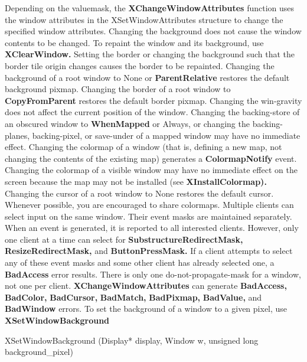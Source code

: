 \documentclass{report}
\begin{document}
\begin{itemize}
\begin{itemize}
            \end{itemize}
            Depending on the valuemask, the \textbf{XChangeWindowAttributes} function uses the window attributes in the XSetWindowAttributes structure to change the specified window attributes. Changing the background does not cause the window contents to be changed. To repaint the window and its background, use \textbf{XClearWindow.} Setting the border or changing the background such that the border tile origin changes causes the border to be repainted. Changing the background of a root window to None or \textbf{ParentRelative} restores the default background pixmap. Changing the border of a root window to \textbf{CopyFromParent} restores the default border pixmap. Changing the win-gravity does not affect the current position of the window. Changing the backing-store of an obscured window to \textbf{WhenMapped} or Always, or changing the backing-planes, backing-pixel, or save-under of a mapped window may have no immediate effect. Changing the colormap of a window (that is, defining a new map, not changing the contents of the existing map) generates a \textbf{ColormapNotify} event. Changing the colormap of a visible window may have no immediate effect on the screen because the map may not be installed (see \textbf{XInstallColormap).} Changing the cursor of a root window to None restores the default cursor. Whenever possible, you are encouraged to share colormaps.
            \bigbreak \noindent 
            Multiple clients can select input on the same window. Their event masks are maintained separately. When an event is generated, it is reported to all interested clients. However, only one client at a time can select for \textbf{SubstructureRedirectMask,} \textbf{ResizeRedirectMask,} and \textbf{ButtonPressMask.} If a client attempts to select any of these event masks and some other client has already selected one, a \textbf{BadAccess} error results. There is only one do-not-propagate-mask for a window, not one per client.
            \bigbreak \noindent 
            \textbf{XChangeWindowAttributes} can generate \textbf{BadAccess,} \textbf{BadColor,} \textbf{BadCursor,} \textbf{BadMatch,} \textbf{BadPixmap,} \textbf{BadValue,} and \textbf{BadWindow} errors.
            \bigbreak \noindent 
            To set the background of a window to a given pixel, use \textbf{XSetWindowBackground}
            \bigbreak \noindent 
            \begin{cppcode}
                XSetWindowBackground (Display* display, Window w, unsigned long background_pixel)
            \end{cppcode}

\end{itemize}
\end{document}
